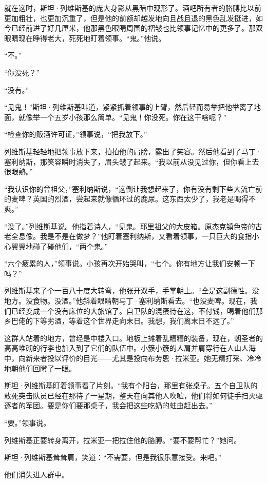 \documentclass[AutoFakeBold=true]{book}
\begin{document}
就在这时，斯坦·列维斯基的庞大身影从黑暗中现形了。酒吧所有者的胳膊比以前更加粗壮，也更加沉重了，但是他的前额却越发地向且战且退的黑色乱发挺进，如今已经前进了好几厘米，他那黑色眼睛周围的褶皱也比领事记忆中的更多了。那双眼睛现在睁得老大，死死地盯着领事。``鬼。''他说。

``不。''

``你没死？''

``没有。''

``见鬼！''斯坦·列维斯基叫道，紧紧抓着领事的上臂，然后轻而易举把他举离了地面，就像举一个五岁小孩那么简单。``见鬼！你没死。你在这干啥呢？''

``检查你的贩酒许可证，''领事说，``把我放下。''

列维斯基轻轻地把领事放下来，拍拍他的肩膀，露出了笑容。然后他看到了马丁·塞利纳斯，那笑容瞬时消失了，眉头皱了起来。``我以前从没见过你，但你看上去很眼熟。''

``我认识你的曾祖父，''塞利纳斯说，``这倒让我想起来了，你有没有剩下些大流亡前的麦啤？英国的烈酒，尝起来就像循环过的鹿尿。这东西太少了，我老是喝得不爽。''

``没了。''列维斯基说。他指着诗人，``见鬼。耶里祖父的大皮箱。原杰克镇色帝的古老全息像。我是不是在做梦？''他盯着塞利纳斯，又看着领事，一只巨大的食指小心翼翼地碰了碰他们，``两个鬼。''

``六个疲累的人，''领事说。小孩再次开始哭叫，``七个。你有地方让我们安顿一下吗？''

列维斯基来了个一百八十度大转弯，他张开双手，手掌朝上。``全是这副德性。没地方。没食物。没酒。''他斜着眼睛朝马丁·塞利纳斯看去。``也没麦啤。现在，我们已经变成一个没有床位的大旅馆了。自卫队的混蛋待在这，不付钱，喝着他们那乡巴佬的下等劣酒，等着这个世界走向末日。我想，我们离末日不远了。''

这群人站着的地方，曾经是中楼入口。地板上摊着乱糟糟的装备，现在，朝圣者的高高堆砌的行李也加入到了它们的队伍中。小簇小簇的人肩并肩穿行在人山人海中，向新来者投以评价的目光——尤其是投向布劳恩·拉米亚。她无精打采、冷冷地朝他们回瞪了一眼。

斯坦·列维斯基盯着领事看了片刻。``我有个阳台，那里有张桌子。五个自卫队的敢死突击队员已经在那待了一星期，整天在向其他人吹嘘，他们将如何徒手扫灭驱逐者的军团。要是你们要那桌子，我会把这些吃奶的蛀虫赶出去。''

``要。''领事说。

列维斯基正要转身离开，拉米亚一把拉住他的胳膊。``要不要帮忙？''她问。

斯坦·列维斯基耸耸肩，笑道：``不需要，但是我很乐意接受。来吧。''

他们消失进人群中。
\end{document}
